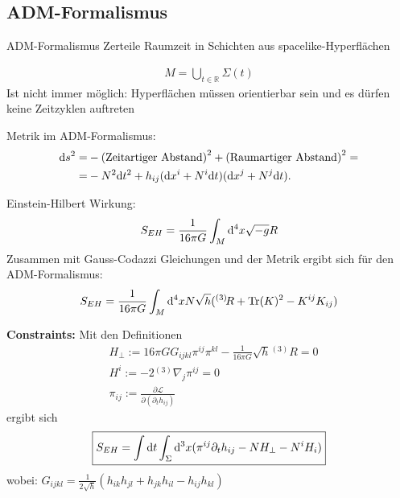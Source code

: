 \documentclass[mathserif]{beamer}
\newcommand{\inHS}{{}^{(3)}\!}
\theoremstyle{definition}
\begin{document}
\subsection{ADM-Formalismus}
	\begin{frame}{ADM-Formalismus}
		Zerteile Raumzeit in Schichten aus spacelike-Hyperflächen
		\begin{center}
			
		\end{center}
		\begin{align}
			M=\bigcup_{t\in\mathbb{R}}\Sigma(t)
		\end{align}
		\pause
		Ist nicht immer möglich: Hyperflächen müssen orientierbar sein und es dürfen keine Zeitzyklen auftreten
	\end{frame}
	\begin{frame}
		Metrik im ADM-Formalismus:
		\begin{align}
			{\rm d}s^2=&-{\rm (Zeitartiger\ Abstand)}^2+{\rm (Raumartiger\ Abstand)}^2=\notag\\
			=&-N^2 {\rm d}t^2+h_{ij}({\rm d}x^i+N^i {\rm d}t)({\rm d}x^j+N^j {\rm d}t).
		\end{align}
	\end{frame}
	\begin{frame}
		Einstein-Hilbert Wirkung:
		\begin{align}
			S_{EH}=\frac{1}{16\pi G}\int_M{\rm d}^4x \sqrt{-g}R
		\end{align}
		\pause
		Zusammen mit Gauss-Codazzi Gleichungen und der Metrik ergibt sich für den ADM-Formalismus:
		\begin{align}
			S_{EH}=\frac{1}{16\pi G}\int_M{\rm d}^4x N\sqrt{h}(\inHS R+{\rm Tr}(K)^2-K^{ij}K_{ij})
		\end{align}
	\end{frame}
	\begin{frame}
		\textbf{Constraints:}
		Mit den Definitionen
		\begin{align}
			&H_{\perp}:=16\pi G G_{ijkl}\pi^{ij}\pi^{kl}-\frac{1}{16\pi G}\sqrt{h}\inHS R=0 \label{equ:constraint1}\\
			&H^i:=-2\inHS\nabla_j\pi^{ij}=0 \label{equ:constraint2}\\
			&\pi_{ij}:=\frac{\partial \mathcal{L}}{\partial(\partial_t h_{ij})}
		\end{align}
		ergibt sich
		\begin{align*}
			\boxed{S_{EH}=\int{\rm d}t\int_\Sigma {\rm d}^3x (\pi^{ij}\partial_t h_{ij}-NH_{\perp}-N^i H_i)}
		\end{align*}
		wobei: $G_{ijkl}=\frac{1}{2\sqrt{h}}(h_{ik}h_{jl}+h_{jk}h_{il}-h_{ij}h_{kl})$
	\end{frame}
\end{document}
